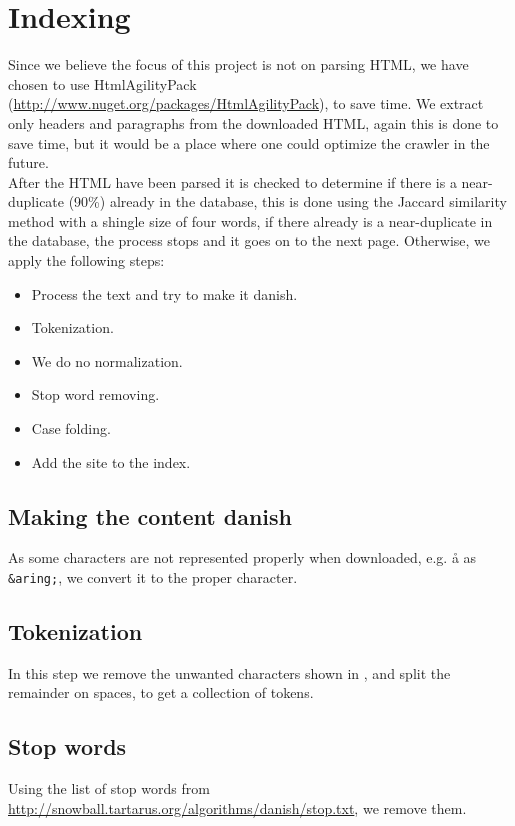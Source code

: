 \section{Indexing}
Since we believe the focus of this project is not on parsing HTML, we have chosen to use HtmlAgilityPack (\url{http://www.nuget.org/packages/HtmlAgilityPack}), to save time. We extract only headers and paragraphs from the downloaded HTML, again this is done to save time, but it would be a place where one could optimize the crawler in the future.\\

After the HTML have been parsed it is checked  to determine if there is a near-duplicate (90\%) already in the database, this is done using the Jaccard similarity method with a shingle size of four words, if there already is a near-duplicate in the database, the process stops and it goes on to the next page. Otherwise, we apply the following steps:

\begin{itemize}
    \item Process the text and try to make it danish.
	\item Tokenization.
    \item We do no normalization.
	\item Stop word removing.
	\item Case folding.
    \item Add the site to the index.
\end{itemize}

\subsection{Making the content danish}
As some characters are not represented properly when downloaded, e.g. å as \texttt{\&aring;}, we convert it to the proper character.

\subsection{Tokenization}
In this step we remove the unwanted characters shown in , and split the remainder on spaces, to get a collection of tokens.

\subsection{Stop words}
Using the list of stop words from \url{http://snowball.tartarus.org/algorithms/danish/stop.txt}, we remove them.

